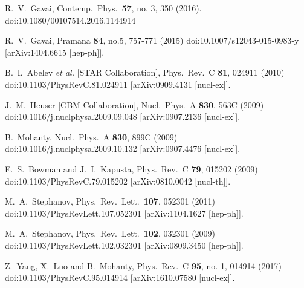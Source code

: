 \begin{thebibliography}{99}
  R.~V.~Gavai,
  Contemp.\ Phys.\  {\bf 57}, no. 3, 350 (2016).
  doi:10.1080/00107514.2016.1144914

R.~V.~Gavai,
Pramana \textbf{84}, no.5, 757-771 (2015)
doi:10.1007/s12043-015-0983-y
[arXiv:1404.6615 [hep-ph]].


  B.~I.~Abelev {\it et al.} [STAR Collaboration],
  Phys.\ Rev.\ C {\bf 81}, 024911 (2010)
  doi:10.1103/PhysRevC.81.024911
  [arXiv:0909.4131 [nucl-ex]].
 
  J.~M.~Heuser [CBM Collaboration],
  Nucl.\ Phys.\ A {\bf 830}, 563C (2009)
  doi:10.1016/j.nuclphysa.2009.09.048
  [arXiv:0907.2136 [nucl-ex]].
 
  B.~Mohanty,
  Nucl.\ Phys.\ A {\bf 830}, 899C (2009)
  doi:10.1016/j.nuclphysa.2009.10.132
  [arXiv:0907.4476 [nucl-ex]].
 
 
  E.~S.~Bowman and J.~I.~Kapusta,
  Phys.\ Rev.\ C {\bf 79}, 015202 (2009)
  doi:10.1103/PhysRevC.79.015202
  [arXiv:0810.0042 [nucl-th]].
 
  M.~A.~Stephanov,
  Phys.\ Rev.\ Lett.\  {\bf 107}, 052301 (2011)
  doi:10.1103/PhysRevLett.107.052301
  [arXiv:1104.1627 [hep-ph]].
  
  M.~A.~Stephanov,
  Phys.\ Rev.\ Lett.\  {\bf 102}, 032301 (2009)
  doi:10.1103/PhysRevLett.102.032301
  [arXiv:0809.3450 [hep-ph]].

 
  Z.~Yang, X.~Luo and B.~Mohanty,
  Phys.\ Rev.\ C {\bf 95}, no. 1, 014914 (2017)
  doi:10.1103/PhysRevC.95.014914
  [arXiv:1610.07580 [nucl-ex]].
 

\end{thebibliography}
